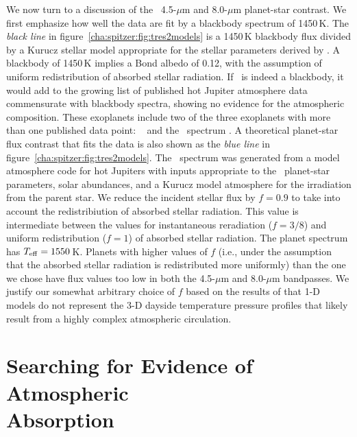 We now turn to a discussion of the \tresTwo\ 4.5-$\mu$m and 8.0-$\mu$m planet-star contrast.
We first emphasize how well the data are fit by a blackbody spectrum of 1450\,K.
The {\it black line} in figure~\ref{cha:spitzer:fig:tres2models} is a 1450\,K blackbody flux divided by a Kurucz stellar model appropriate for the stellar parameters derived by \citet{Sozzetti_Torres_Charbonneau:apj:2007a}.
A blackbody of 1450\,K implies a Bond albedo of 0.12, with the assumption of uniform redistribution of absorbed stellar radiation.
If \tresTwo\ is indeed a blackbody, it would add to the growing list of published hot Jupiter atmosphere data commensurate with blackbody spectra, showing no evidence for the atmospheric composition.
These exoplanets include two of the three exoplanets with more than one published data point: \tresOne\ \citep{Charbonneau_Allen_Megeath:apj:2005a} and the \hdOENb\ spectrum \citep{Grillmair_Charbonneau_Burrows:apjl:2007a}.
A theoretical planet-star flux contrast that fits the data is also shown as the {\it blue line} in figure~\ref{cha:spitzer:fig:tres2models}.
The \tresTwo\ spectrum was generated from a model atmosphere code for hot Jupiters \citep{Seager_Richardson_Hansen:apj:2005a} with inputs appropriate to the \tresTwo\ planet-star parameters, solar abundances, and a Kurucz model atmosphere for the irradiation from the parent star.
We reduce the incident stellar flux by \mbox{$f=0.9$} to take into account the redistribiution of absorbed stellar radiation.
This value is intermediate between the values for instantaneous reradiation (\mbox{$f=3/8$}) and uniform redistribution (\mbox{$f=1$}) of absorbed stellar radiation.
The planet spectrum has \mbox{$T_{\rm eff}=1550$\,K}.
Planets with higher values of $f$ (i.e., under the assumption that the absorbed stellar radiation is redistributed more uniformly) than the one we chose have flux values too low in both the 4.5-$\mu$m and 8.0-$\mu$m bandpasses.
We justify our somewhat arbitrary choice of $f$ based on the results of \citet{Fortney_Cooper_Showman:apj:2006a} that 1-D models do not represent the 3-D dayside temperature pressure profiles that likely result from a highly complex atmospheric circulation.

\section[Searching for Evidence of Atmospheric Absorption]{Searching for Evidence of Atmospheric \\ Absorption}
\label{cha:spitzer:sec:discuss}

